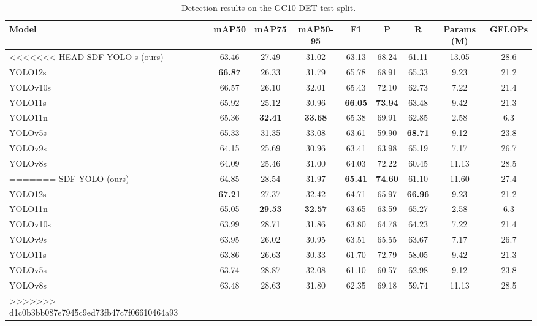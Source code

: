 \begin{table}[t]\centering\small
\caption{Detection results on the GC10-DET test split.}
\begin{tabular}{lcccccccc}\toprule
Model & mAP50 & mAP75 & mAP50-95 & F1 & P & R & Params (M) & GFLOPs \\ \midrule
<<<<<<< HEAD
SDF-YOLO-s (ours) & 63.46 & 27.49 & 31.02 & 63.13 & 68.24 & 61.11 & 13.05 & 28.6 \\
YOLO12s & \textbf{66.87} & 26.33 & 31.79 & 65.78 & 68.91 & 65.33 & 9.23 & 21.2 \\
YOLOv10s & 66.57 & 26.10 & 32.01 & 65.43 & 72.10 & 62.73 & 7.22 & 21.4 \\
YOLO11s & 65.92 & 25.12 & 30.96 & \textbf{66.05} & \textbf{73.94} & 63.48 & 9.42 & 21.3 \\
YOLO11n & 65.36 & \textbf{32.41} & \textbf{33.68} & 65.38 & 69.91 & 62.85 & 2.58 & 6.3 \\
YOLOv5s & 65.33 & 31.35 & 33.08 & 63.61 & 59.90 & \textbf{68.71} & 9.12 & 23.8 \\
YOLOv9s & 64.15 & 25.69 & 30.96 & 63.41 & 63.98 & 65.19 & 7.17 & 26.7 \\
YOLOv8s & 64.09 & 25.46 & 31.00 & 64.03 & 72.22 & 60.45 & 11.13 & 28.5 \\
=======
SDF-YOLO (ours) & 64.85 & 28.54 & 31.97 & \textbf{65.41} & \textbf{74.60} & 61.10 & 11.60 & 27.4 \\
YOLO12s & \textbf{67.21} & 27.37 & 32.42 & 64.71 & 65.97 & \textbf{66.96} & 9.23 & 21.2 \\
YOLO11n & 65.05 & \textbf{29.53} & \textbf{32.57} & 63.65 & 63.59 & 65.27 & 2.58 & 6.3 \\
YOLOv10s & 63.99 & 28.71 & 31.86 & 63.80 & 64.78 & 64.23 & 7.22 & 21.4 \\
YOLOv9s & 63.95 & 26.02 & 30.95 & 63.51 & 65.55 & 63.67 & 7.17 & 26.7 \\
YOLO11s & 63.86 & 26.63 & 30.33 & 61.70 & 72.79 & 58.05 & 9.42 & 21.3 \\
YOLOv5s & 63.74 & 28.87 & 32.08 & 61.10 & 60.57 & 62.98 & 9.12 & 23.8 \\
YOLOv8s & 63.48 & 28.63 & 31.80 & 62.35 & 69.18 & 59.74 & 11.13 & 28.5 \\
>>>>>>> d1c0b3bb087e7945c9ed73fb47c7f06610464a93
\bottomrule\end{tabular}\end{table}
